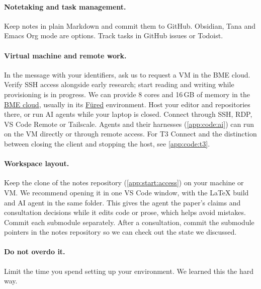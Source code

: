 \paragraph{Notetaking and task management.} Keep notes in plain Markdown and commit them to GitHub. Obsidian, Tana and Emacs Org mode are options. Track tasks in GitHub issues or Todoist.

\paragraph{Virtual machine and remote work.} In the message with your identifiers, ask us to request a VM in the BME cloud. Verify SSH access alongside early research; start reading and writing while provisioning is in progress. We can provide 8 cores and 16\,GB of memory in the \href{https://cloud.bme.hu/}{BME cloud}, usually in its \href{https://fured.cloud.bme.hu/}{Füred} environment. Host your editor and repositories there, or run AI agents while your laptop is closed. Connect through SSH, RDP, VS Code Remote or Tailscale. Agents and their harnesses (\cref{app:code:ai}) can run on the VM directly or through remote access. For T3 Connect and the distinction between closing the client and stopping the host, see \cref{app:code:t3}.

\paragraph{Workspace layout.} Keep the clone of the notes repository (\cref{app:start:access}) on your machine or VM. We recommend opening it in one VS Code window, with the \LaTeX{} build and AI agent in the same folder. This gives the agent the paper's claims and consultation decisions while it edits code or prose, which helps avoid mistakes. Commit each submodule separately. After a consultation, commit the submodule pointers in the notes repository so we can check out the state we discussed.

\paragraph{Do not overdo it.} Limit the time you spend setting up your environment. We learned this the hard way.

